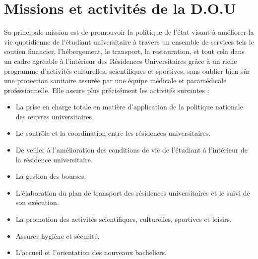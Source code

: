 \section{Missions et activités de la D.O.U}
    Sa principale mission est de promouvoir la politique de l'état visant à améliorer la vie quotidienne de l'étudiant universitaire à travers un ensemble de services tels le soutien financier, l'hébergement, le transport, la restauration, et tout cela dans un cadre agréable à l'intérieur des Résidences Universitaires grâce à un riche programme d'activités culturelles, scientifiques et sportives, sans oublier bien sûr une protection sanitaire assurée par une équipe médicale et paramédicale professionnelle. Elle assure plus précisément les activités suivantes :\\
    \begin{itemize}
        \item La prise en charge totale en matière d’application de la politique nationale des œuvres universitaires.
        \item Le contrôle et la coordination entre les résidences universitaires.
        \item De veiller à l’amélioration des conditions de vie de l’étudiant à l’intérieur de la résidence universitaire.
        \item La gestion des bourses.
        \item L’élaboration du plan de transport des résidences universitaires et le suivi de son exécution.
        \item La promotion des activités scientifiques, culturelles, sportives et loisirs.
        \item Assurer hygiène et sécurité.
        \item L’accueil et l’orientation des nouveaux bacheliers.
    \end{itemize}

